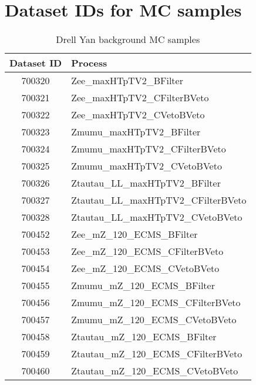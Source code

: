 \documentclass[14pt, a4paper]{book}
\begin{document}
\chapter{Dataset IDs for MC samples}\label{appendix:DSIDs}
\begin{table}[!h]
    \centering
    \caption{Drell Yan background MC samples}
    \begin{tabular}{c|l}\midrule\midrule
        Dataset ID              & Process\\\midrule
        700320                  & Zee\_maxHTpTV2\_BFilter\\
        700321                  & Zee\_maxHTpTV2\_CFilterBVeto\\
        700322                  & Zee\_maxHTpTV2\_CVetoBVeto\\
        700323                  & Zmumu\_maxHTpTV2\_BFilter\\
        700324                  & Zmumu\_maxHTpTV2\_CFilterBVeto\\
        700325                  & Zmumu\_maxHTpTV2\_CVetoBVeto\\
        700326                  & Ztautau\_LL\_maxHTpTV2\_BFilter\\
        700327                  & Ztautau\_LL\_maxHTpTV2\_CFilterBVeto\\
        700328                  & Ztautau\_LL\_maxHTpTV2\_CVetoBVeto\\
        700452                  & Zee\_mZ\_120\_ECMS\_BFilter\\
        700453                  & Zee\_mZ\_120\_ECMS\_CFilterBVeto\\
        700454                  & Zee\_mZ\_120\_ECMS\_CVetoBVeto\\
        700455                  & Zmumu\_mZ\_120\_ECMS\_BFilter\\
        700456                  & Zmumu\_mZ\_120\_ECMS\_CFilterBVeto\\
        700457                  & Zmumu\_mZ\_120\_ECMS\_CVetoBVeto\\
        700458                  & Ztautau\_mZ\_120\_ECMS\_BFilter\\
        700459                  & Ztautau\_mZ\_120\_ECMS\_CFilterBVeto\\
        700460                  & Ztautau\_mZ\_120\_ECMS\_CVetoBVeto \\\midrule\midrule
    \end{tabular}
    \label{tab:DY_DSID}
\end{table}
\end{document}
